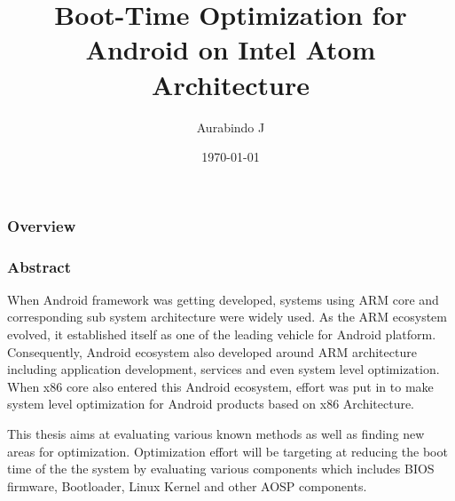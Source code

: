 \documentclass{beamer}
\title[x86 Boot Optimization]{Boot-Time Optimization for Android on Intel Atom Architecture}
\author{Aurabindo J}
\institute[SOIS]
{
	Manipal University \\
	\medskip
	\textit{mail@aurabindo.in}
}
\date{\today}
\begin{document}
\begin{frame}
	\titlepage
\end{frame}

\begin{frame}
	\frametitle{Overview}
	\tableofcontents
\end{frame}

\begin{frame}
	\frametitle{Abstract}

%
\hspace{6mm} When Android framework was getting developed, systems using ARM core and
corresponding sub system architecture were widely used. As the ARM ecosystem evolved,
it established itself as one of the leading vehicle for Android platform. Consequently,
Android ecosystem also developed around ARM architecture including application
development, services and even system level optimization. When x86 core also entered
this Android ecosystem, effort was put in to make system level optimization for
Android products based on x86 Architecture.

This thesis aims at evaluating various known methods as well as finding new areas
for optimization. Optimization effort will be targeting at reducing the boot time of
the the system by evaluating various components which includes BIOS firmware,
Bootloader, Linux Kernel and other AOSP components.
\end{frame}









\begin{frame}
\nocite{*}


\end{frame}
\end{document}
